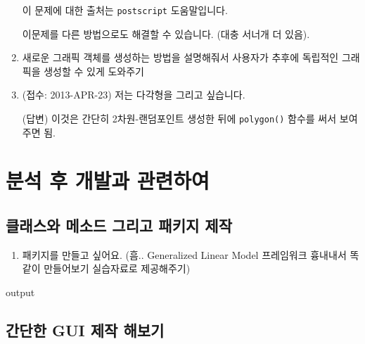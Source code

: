 \documentclass{report}
\begin{document}
\begin{enumerate}
이 문제에 대한 출처는 \texttt{postscript} 도움말입니다.

이문제를 다른 방법으로도 해결할 수 있습니다.  (대충 서너개 더 있음).

\item 새로운 그래픽 객체를 생성하는 방법을 설명해줘서 사용자가 추후에 독립적인 그래픽을 생성할 수 있게 도와주기 


	\item (접수: 2013-APR-23)  저는 다각형을 그리고 싶습니다. 
	
	\textsf{(답변)}  이것은 간단히 2차원-랜덤포인트 생성한 뒤에 \texttt{polygon()} 함수를 써서 보여주면 됨. 

\end{enumerate}





%
%



\chapter{분석 후 개발과 관련하여}
\section{클래스와 메소드 그리고 패키지 제작}
\begin{enumerate}
\item 패키지를 만들고 싶어요. (흠.. Generalized Linear Model 프레임워크 흉내내서 똑같이 만들어보기 실습자료로 제공해주기)
\end{enumerate}
\begin{Schunk}
\begin{Soutput}
output
\end{Soutput}
\end{Schunk}



%
%


%
%
%

\section{간단한 GUI 제작 해보기}
\end{document}
